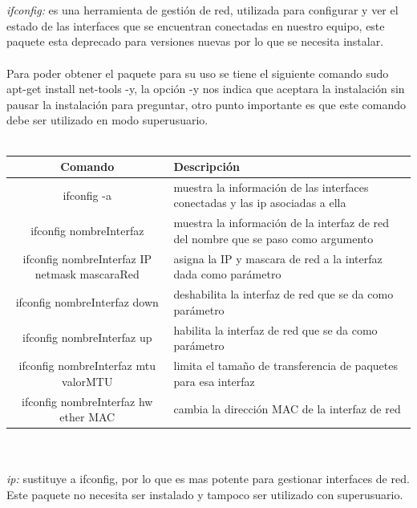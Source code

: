\documentclass[10pt,a4paper,titlepage]{article}
\begin{document}
	\\
	\\
	\emph{ifconfig:} es una herramienta de gestión de red, utilizada para configurar y ver el estado de las interfaces que se encuentran conectadas en nuestro equipo, este paquete esta deprecado para versiones nuevas por lo que se necesita instalar.
	\\
	\\
	Para poder obtener el paquete para su uso se tiene el siguiente comando sudo apt-get install net-tools -y, la opción -y nos indica que aceptara la instalación sin pausar la instalación para preguntar, otro punto importante es que este comando debe ser utilizado en modo superusuario.
	\\
	\\
	\begin{tabular}{|c|p{7cm}|}
		\hline
		Comando & Descripción \\
		\hline
		ifconfig -a & muestra la información de las interfaces conectadas y las ip asociadas a ella \\
		\hline
		ifconfig nombreInterfaz & muestra la información de la interfaz de red del nombre que se paso como argumento \\
		\hline
		ifconfig nombreInterfaz IP netmask mascaraRed & asigna la IP y mascara de red a la interfaz dada como parámetro \\
		\hline
		ifconfig nombreInterfaz down & deshabilita la interfaz de red que se da como parámetro \\
		\hline
		ifconfig nombreInterfaz up & habilita la interfaz de red que se da como parámetro \\
		\hline
		ifconfig nombreInterfaz mtu valorMTU & limita el tamaño de transferencia de paquetes para esa interfaz \\
		\hline
		ifconfig nombreInterfaz hw ether MAC & cambia la dirección MAC de la interfaz de red \\
		\hline
	\end{tabular}
	\\
	\\
	\emph{ip:} sustituye a ifconfig, por lo que es mas potente para gestionar interfaces de red. Este paquete no necesita ser instalado y tampoco ser utilizado con superusuario.
	\\
	\\
\end{document}
